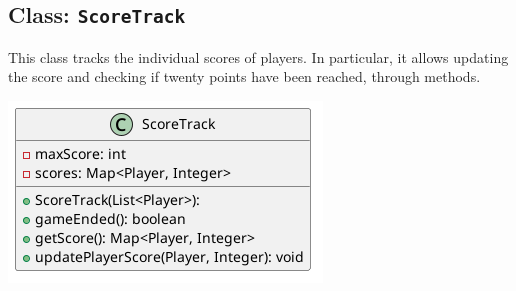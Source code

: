 \documentclass{article}
\begin{document}
\newpage
\subsection{Class: \texttt{ScoreTrack}}
This class tracks the individual scores of players.
In particular, it allows updating the score and checking if twenty points have been reached, through methods.

\vspace{1cm}
\begin{center}
    \includegraphics[scale=0.5]{pngs/ScoreTrack}
\end{center}
\newpage
\end{document}
